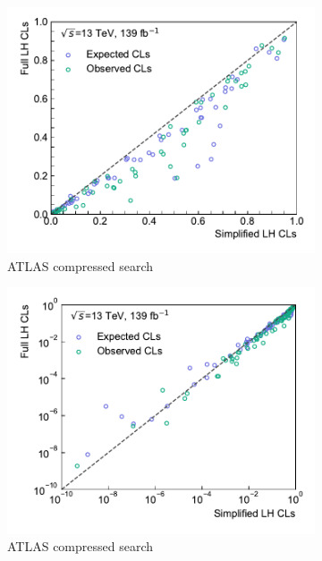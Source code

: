 \begin{figure}
\begin{subfigure}[b]{0.5\textwidth}
		\centering\includegraphics[width=\textwidth]{cls_scatter_compressed_lin}
		\caption{ATLAS compressed search~\cite{SUSY-2018-16}}
	\end{subfigure}\hfill
	\begin{subfigure}[b]{0.5\textwidth}
		\centering\includegraphics[width=\textwidth]{cls_scatter_compressed_log}
		\caption{ATLAS compressed search~\cite{SUSY-2018-16}}
	\end{subfigure}\hfill
	\caption{}\label{fig:app_results_cls_2}
\end{figure}